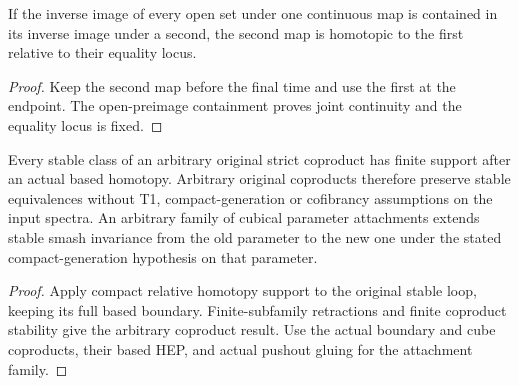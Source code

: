 \begin{proposition}
  \label{prop:actual-specialization-relative-homotopy}
  \leanok
  If the inverse image of every open set under one continuous map is contained in its inverse image under a second, the second map is homotopic to the first relative to their equality locus.
\end{proposition}
\begin{proof}
  Keep the second map before the final time and use the first at the endpoint. The open-preimage containment proves joint continuity and the equality locus is fixed.
  \leanok
\end{proof}

\begin{proposition}
  \label{prop:actual-arbitrary-coproduct-and-cell-flatness}
  \leanok
  Every stable class of an arbitrary original strict coproduct has finite support after an actual based homotopy. Arbitrary original coproducts therefore preserve stable equivalences without T1, compact-generation or cofibrancy assumptions on the input spectra. An arbitrary family of cubical parameter attachments extends stable smash invariance from the old parameter to the new one under the stated compact-generation hypothesis on that parameter.
\end{proposition}
\begin{proof}
  Apply compact relative homotopy support to the original stable loop, keeping its full based boundary. Finite-subfamily retractions and finite coproduct stability give the arbitrary coproduct result. Use the actual boundary and cube coproducts, their based HEP, and actual pushout gluing for the attachment family.
  \leanok
\end{proof}

